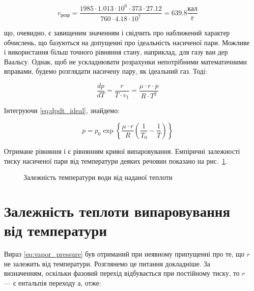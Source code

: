 \begin{equation}\label{eq:r_calc}
r_{\text{розр}} = \frac{1985 \cdot 1.013 \cdot 10^6 \cdot 373 \cdot 27.12}{760 \cdot 4.18 \cdot 10^7}
= 639.8\frac{\text{кал}}{\text{г}}
\end{equation}

що, очевидно, є завищеним значенням і свідчить про наближений характер обчислень, що базуються на
допущенні про ідеальність насиченої пари. Можливе і використання більш точного рівняння стану,
наприклад, для газу ван дер Ваальсу. Однак, щоб не ускладнювати розрахунки непотрібними математичними
вправами, будемо розглядати насичену пару, як ідеальний газ. Тоді:

\begin{equation}\label{eq:dpdt_ideal}
\frac{dp}{dT} = \frac{r}{T \cdot v_1} = \frac{\mu \cdot r \cdot p}{R \cdot T^2}
\end{equation}

Інтегруючи \eqref{eq:dpdt_ideal}, знайдемо:

\begin{equation}\label{eq:vapor_pressure}
p = p_0\exp\left\{ \frac{\mu \cdot r}{R}\left( \frac{1}{T_0} - \frac{1}{T} \right) \right\}
\end{equation}

Отримане рівняння і є рівнянням кривої випаровування. Емпіричні залежності тиску насиченої пари від
температури деяких речовин показано на рис.~\ref{pic:Pic4}.

\begin{figure}[h!]\centering

\caption{Залежність температури води від наданої теплоти}
\label{pic:Pic4}
\end{figure}



\section{Залежність теплоти випаровування від температури}


Вираз \eqref{eq:vapor_pressure} був отриманий при неявному припущенні про те, що $r$ не залежить від
температури. Розглянемо це питання докладніше. За визначенням, оскільки фазовий перехід відбувається
при постійному тиску, то $r$ --- є ентальпія переходу а, отже:

